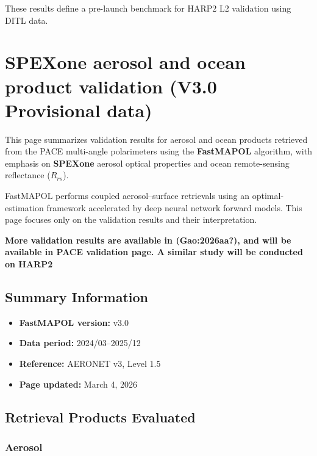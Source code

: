 \documentclass[
  letterpaper,
]{scrbook}
\providecommand{\tightlist}{%
  \setlength{\itemsep}{0pt}\setlength{\parskip}{0pt}}
\begin{document}
These results define a pre-launch benchmark for HARP2 L2 validation
using DITL data.


\chapter{SPEXone aerosol and ocean product validation (V3.0 Provisional
data)}\label{spexone-aerosol-and-ocean-product-validation-v3.0-provisional-data}

This page summarizes validation results for aerosol and ocean products
retrieved from the PACE multi-angle polarimeters using the
\textbf{FastMAPOL} algorithm, with emphasis on \textbf{SPEXone} aerosol
optical properties and ocean remote-sensing reflectance (\(R_{rs}\)).

FastMAPOL performs coupled aerosol--surface retrievals using an
optimal-estimation framework accelerated by deep neural network forward
models. This page focuses only on the validation results and their
interpretation.

\textbf{More validation results are available in (\textbf{Gao:2026aa?}),
and will be available in PACE validation page. A similar study will be
conducted on HARP2}

\section{Summary Information}\label{summary-information-1}

\begin{itemize}
\tightlist
\item
  \textbf{FastMAPOL version:} v3.0\\
\item
  \textbf{Data period:} 2024/03--2025/12\\
\item
  \textbf{Reference:} AERONET v3, Level 1.5\\
\item
  \textbf{Page updated:} March 4, 2026
\end{itemize}

\section{Retrieval Products
Evaluated}\label{retrieval-products-evaluated}

\subsection{Aerosol}\label{aerosol}
\end{document}

